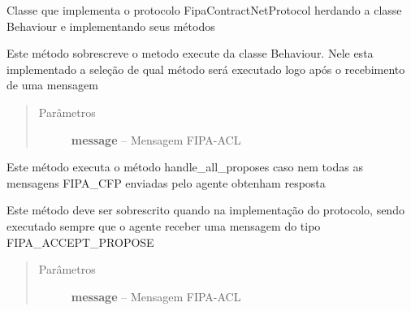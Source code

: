 \documentclass[letterpaper,10pt,brazil]{sphinxmanual}
\begin{document}
\begin{fulllineitems}
\label{api:pade.behaviours.protocols.FipaContractNetProtocol}
Classe que implementa o protocolo FipaContractNetProtocol
herdando a classe Behaviour e implementando seus métodos

\begin{fulllineitems}
\label{api:pade.behaviours.protocols.FipaContractNetProtocol.execute}
Este método sobrescreve o metodo execute da classe 
Behaviour. Nele esta implementado a seleção de qual
método será executado logo após o recebimento de uma
mensagem
\begin{quote}\begin{description}
\item[{Parâmetros}] \leavevmode
\textbf{message} -- Mensagem FIPA-ACL

\end{description}\end{quote}

\end{fulllineitems}


\begin{fulllineitems}
\label{api:pade.behaviours.protocols.FipaContractNetProtocol.execute_on_timeout}
Este método executa o método handle\_all\_proposes caso nem
todas as mensagens FIPA\_CFP enviadas pelo agente obtenham
resposta

\end{fulllineitems}


\begin{fulllineitems}
\label{api:pade.behaviours.protocols.FipaContractNetProtocol.handle_accept_propose}
Este método deve ser sobrescrito quando na implementação
do protocolo, sendo executado sempre que o agente receber
uma mensagem do tipo FIPA\_ACCEPT\_PROPOSE
\begin{quote}\begin{description}
\item[{Parâmetros}] \leavevmode
\textbf{message} -- Mensagem FIPA-ACL


\end{description}
\end{quote}
\end{fulllineitems}
\end{fulllineitems}
\end{document}
